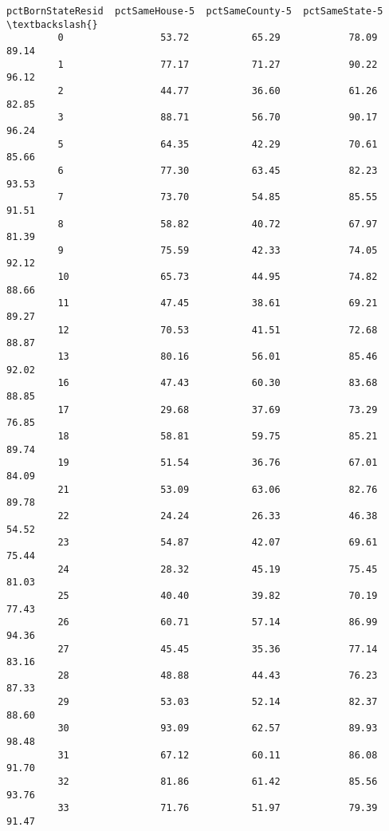 \documentclass[11pt]{llncs}
\begin{document}
\begin{Verbatim}[commandchars=\\\{\}]
               pctBornStateResid  pctSameHouse-5  pctSameCounty-5  pctSameState-5  \textbackslash{}
         0                 53.72           65.29            78.09           89.14   
         1                 77.17           71.27            90.22           96.12   
         2                 44.77           36.60            61.26           82.85   
         3                 88.71           56.70            90.17           96.24   
         5                 64.35           42.29            70.61           85.66   
         6                 77.30           63.45            82.23           93.53   
         7                 73.70           54.85            85.55           91.51   
         8                 58.82           40.72            67.97           81.39   
         9                 75.59           42.33            74.05           92.12   
         10                65.73           44.95            74.82           88.66   
         11                47.45           38.61            69.21           89.27   
         12                70.53           41.51            72.68           88.87   
         13                80.16           56.01            85.46           92.02   
         16                47.43           60.30            83.68           88.85   
         17                29.68           37.69            73.29           76.85   
         18                58.81           59.75            85.21           89.74   
         19                51.54           36.76            67.01           84.09   
         21                53.09           63.06            82.76           89.78   
         22                24.24           26.33            46.38           54.52   
         23                54.87           42.07            69.61           75.44   
         24                28.32           45.19            75.45           81.03   
         25                40.40           39.82            70.19           77.43   
         26                60.71           57.14            86.99           94.36   
         27                45.45           35.36            77.14           83.16   
         28                48.88           44.43            76.23           87.33   
         29                53.03           52.14            82.37           88.60   
         30                93.09           62.57            89.93           98.48   
         31                67.12           60.11            86.08           91.70   
         32                81.86           61.42            85.56           93.76   
         33                71.76           51.97            79.39           91.47   

\end{Verbatim}
\end{document}
